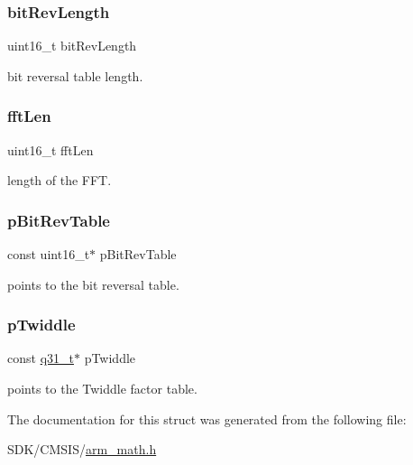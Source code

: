 \subsubsection{\texorpdfstring{bit\+Rev\+Length}{bitRevLength}}
{\footnotesize\ttfamily uint16\+\_\+t bit\+Rev\+Length}

bit reversal table length. \mbox{\label{structarm__cfft__instance__q31_ab8db3bbe7c61e6bb8ca2a55e3446e11a}} 
\subsubsection{\texorpdfstring{fft\+Len}{fftLen}}
{\footnotesize\ttfamily uint16\+\_\+t fft\+Len}

length of the F\+FT. \mbox{\label{structarm__cfft__instance__q31_a3b229432d381b0a511a9cdbe3aa74e78}} 
\subsubsection{\texorpdfstring{p\+Bit\+Rev\+Table}{pBitRevTable}}
{\footnotesize\ttfamily const uint16\+\_\+t$\ast$ p\+Bit\+Rev\+Table}

points to the bit reversal table. \mbox{\label{structarm__cfft__instance__q31_a9760c603af5d85652496dbffd63a8a2e}} 
\subsubsection{\texorpdfstring{p\+Twiddle}{pTwiddle}}
{\footnotesize\ttfamily const \mbox{\hyperlink{arm__math_8h_adc89a3547f5324b7b3b95adec3806bc0}{q31\+\_\+t}}$\ast$ p\+Twiddle}

points to the Twiddle factor table. 

The documentation for this struct was generated from the following file\+:\begin{DoxyCompactItemize}
\item 
S\+D\+K/\+C\+M\+S\+I\+S/\mbox{\hyperlink{arm__math_8h}{arm\+\_\+math.\+h}}\end{DoxyCompactItemize}

